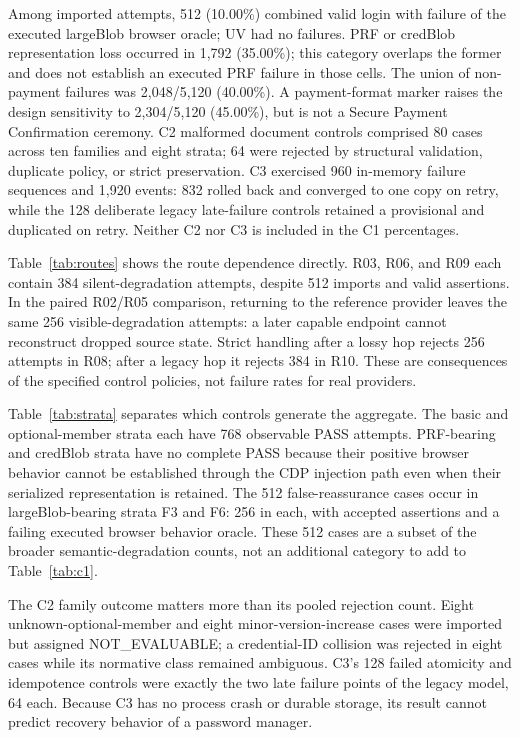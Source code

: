 \documentclass[letterpaper,twocolumn,10pt]{article}
\begin{document}
Among imported attempts, 512 (10.00\%) combined valid login with failure
of the executed largeBlob browser oracle; UV had no failures. PRF or credBlob
representation loss occurred in 1,792 (35.00\%); this category overlaps
the former and does not establish an executed PRF failure in those cells.
The union of non-payment failures was 2,048/5,120 (40.00\%). A
payment-format marker raises the design sensitivity to 2,304/5,120
(45.00\%), but is not a Secure Payment Confirmation ceremony. C2 malformed
document controls comprised 80 cases across ten families and eight strata;
64 were rejected by structural validation, duplicate policy, or strict
preservation. C3 exercised 960 in-memory failure sequences and 1,920 events:
832 rolled back and converged to one copy on retry, while the 128 deliberate
legacy late-failure controls retained a provisional and duplicated on retry.
Neither C2 nor C3 is included in the C1 percentages.

Table~\ref{tab:routes} shows the route dependence directly. R03, R06,
and R09 each contain 384 silent-degradation attempts, despite 512
imports and valid assertions. In the paired R02/R05 comparison, returning
to the reference provider leaves the same 256 visible-degradation
attempts: a later capable endpoint cannot reconstruct dropped source
state. Strict handling after a lossy hop rejects 256 attempts in R08;
after a legacy hop it rejects 384 in R10. These are consequences of the
specified control policies, not failure rates for real providers.

Table~\ref{tab:strata} separates which controls generate the aggregate.
The basic and optional-member strata each have 768 observable PASS
attempts. PRF-bearing and credBlob strata have no complete PASS because
their positive browser behavior cannot be established through the CDP
injection path even when their serialized representation is retained.
The 512 false-reassurance cases occur in largeBlob-bearing strata F3
and F6: 256 in each, with accepted assertions and a failing executed
browser behavior oracle. These 512 cases are a subset of the broader
semantic-degradation counts, not an additional category to add to
Table~\ref{tab:c1}.

The C2 family outcome matters more than its pooled rejection count.
Eight unknown-optional-member and eight minor-version-increase cases
were imported but assigned NOT\_EVALUABLE; a credential-ID collision
was rejected in eight cases while its normative class remained
ambiguous. C3's 128 failed atomicity and idempotence controls were
exactly the two late failure points of the legacy model, 64 each.
Because C3 has no process crash or durable storage, its result cannot
predict recovery behavior of a password manager.
\end{document}
